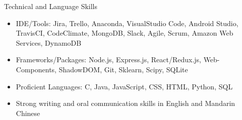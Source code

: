 \documentclass{resume} %
\begin{document}
\begin{rSection}{Technical and Language Skills}
\begin{itemize}
\item IDE/Tools: \hspace{0.1cm} Jira, Trello, Anaconda, VisualStudio Code, Android Studio, TravisCI, CodeClimate, MongoDB, Slack, Agile, Scrum, Amazon Web Services, DynamoDB
\item Frameworks/Packages: \hspace{0.1cm} Node.js, Express.js, React/Redux.js, Web-Components, ShadowDOM, Git, Sklearn, Scipy, SQLite
\item  Proficient Languages:  \hspace{0.1cm}C, Java, JavaScript, CSS, HTML, Python, SQL 
\item Strong writing and oral communication skills in English and Mandarin Chinese 
\end{itemize}
\end{rSection}
\end{document}
